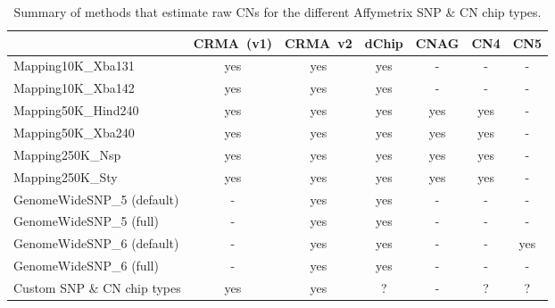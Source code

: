 \documentclass[10pt,a4paper]{article}
\begin{document}

\begin{table}[htp]
\begin{center}
\begin{tabular}{|l|cc|c|c|cc|}
\hline
                             & CRMA~(v1) & CRMA~v2 & dChip & CNAG & CN4 & CN5 \\
\hline
\hline
Mapping10K\_Xba131           & yes     & yes       & yes   &    - &   - &  -  \\
Mapping10K\_Xba142           & yes     & yes       & yes   &    - &   - &  -  \\
\hline
Mapping50K\_Hind240          & yes     & yes       & yes   &  yes & yes &  -  \\
Mapping50K\_Xba240           & yes     & yes       & yes   &  yes & yes &  -  \\
\hline
Mapping250K\_Nsp             & yes     & yes       & yes   &  yes & yes &  -  \\
Mapping250K\_Sty             & yes     & yes       & yes   &  yes & yes &  -  \\
\hline
GenomeWideSNP\_5 (default)   &  -      & yes       & yes   &    - &  -  &  -  \\
GenomeWideSNP\_5 (full)      &  -      & yes       & yes   &    - &  -  &  -  \\
\hline
GenomeWideSNP\_6 (default)   &  -      & yes       & yes   &    - &  -  & yes \\
GenomeWideSNP\_6 (full)      &  -      & yes       & yes   &    - &  -  &  -  \\
\hline
Custom SNP \& CN chip types  &  yes    & yes       &   ?   &    - &  ?  &  ?  \\
\hline
\end{tabular}
\end{center}
\caption{Summary of methods that estimate raw CNs for the different Affymetrix SNP \& CN chip types.}
\label{tblSummaryOfMethods}
\end{table}



\clearpage
\end{document}
